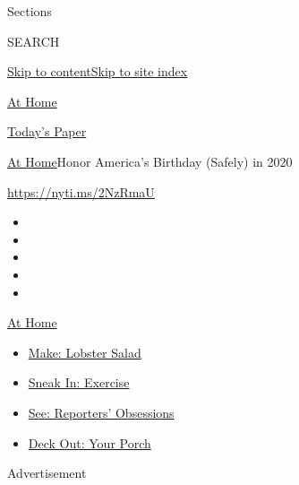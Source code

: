 Sections

SEARCH

\protect\hyperlink{site-content}{Skip to
content}\protect\hyperlink{site-index}{Skip to site index}

\href{https://www.nytimes3xbfgragh.onion/spotlight/at-home}{At Home}

\href{https://myaccount.nytimes3xbfgragh.onion/auth/login?response_type=cookie\&client_id=vi}{}

\href{https://www.nytimes3xbfgragh.onion/section/todayspaper}{Today's
Paper}

\href{/spotlight/at-home}{At Home}\textbar{}Honor America's Birthday
(Safely) in 2020

\url{https://nyti.ms/2NzRmaU}

\begin{itemize}
\item
\item
\item
\item
\item
\end{itemize}

\href{https://www.nytimes3xbfgragh.onion/spotlight/at-home?action=click\&pgtype=Article\&state=default\&region=TOP_BANNER\&context=at_home_menu}{At
Home}

\begin{itemize}
\tightlist
\item
  \href{https://www.nytimes3xbfgragh.onion/2020/08/14/dining/lobster-salad-recipe.html?action=click\&pgtype=Article\&state=default\&region=TOP_BANNER\&context=at_home_menu}{Make:
  Lobster Salad}
\item
  \href{https://www.nytimes3xbfgragh.onion/2020/08/15/at-home/coronavirus-at-home-quick-exercises.html?action=click\&pgtype=Article\&state=default\&region=TOP_BANNER\&context=at_home_menu}{Sneak
  In: Exercise}
\item
  \href{https://www.nytimes3xbfgragh.onion/interactive/2020/at-home/even-more-reporters-editors-diaries-lists-recommendations.html?action=click\&pgtype=Article\&state=default\&region=TOP_BANNER\&context=at_home_menu}{See:
  Reporters' Obsessions}
\item
  \href{https://www.nytimes3xbfgragh.onion/2020/08/15/at-home/coronavirus-fall-patio-furniture.html?action=click\&pgtype=Article\&state=default\&region=TOP_BANNER\&context=at_home_menu}{Deck
  Out: Your Porch}
\end{itemize}

Advertisement

